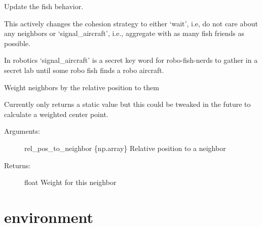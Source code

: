 \documentclass[letterpaper,10pt,english]{sphinxmanual}
\begin{document}
\begin{fulllineitems}
\begin{fulllineitems}
\end{fulllineitems}


\begin{fulllineitems}
\label{\detokenize{index:fish.Fish.update_behavior}}
Update the fish behavior.

This actively changes the cohesion strategy to either ‘wait’, i.e, do
not care about any neighbors or ‘signal\_aircraft’, i.e., aggregate with
as many fish friends as possible.

In robotics ‘signal\_aircraft’ is a secret key word for robo-fish-nerds
to gather in a secret lab until some robo fish finds a robo aircraft.

\end{fulllineitems}


\begin{fulllineitems}
\label{\detokenize{index:fish.Fish.weight_neighbor}}
Weight neighbors by the relative position to them

Currently only returns a static value but this could be tweaked in the
future to calculate a weighted center point.
\begin{description}
\item[{Arguments:}] \leavevmode
rel\_pos\_to\_neighbor \{np.array\} \textendash{} Relative position to a neighbor

\item[{Returns:}] \leavevmode
float \textendash{} Weight for this neighbor

\end{description}

\end{fulllineitems}


\end{fulllineitems}



\chapter{environment}
\label{\detokenize{index:module-environment}}\label{\detokenize{index:environment}}
\end{document}

